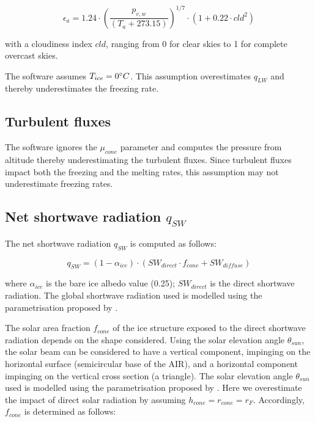 \documentclass[tc, manuscript]{copernicus}
\begin{document}
\begin{equation}
	\epsilon_a=1.24 \cdot (\frac{p_{v,w}}{(T_a+273.15)})^{1/7}\cdot(1+0.22\cdot{cld}^2) \label{eqn:atm_e}
\end{equation}

with a cloudiness index $cld$, ranging from 0 for clear skies to 1 for complete overcast skies. 

The software assumes $T_{ice} = 0 ^{\circ} C$. This assumption overestimates $q_{LW}$ and thereby underestimates
the freezing rate.

\subsection{Turbulent fluxes} \label{sec:Qs}

The software ignores the $\mu_{cone}$ parameter and computes the pressure from altitude thereby underestimating
the turbulent fluxes. Since turbulent fluxes impact both the freezing and the melting rates, this assumption may
not underestimate freezing rates.

\subsection{Net shortwave radiation \texorpdfstring{$q_{SW}$}{Lg}}
\label{sec:SW}

The net shortwave radiation $q_{SW}$ is computed as follows:

\begin{equation} q_{SW} = (1- \alpha_{ice}) \cdot ( SW_{direct} \cdot f_{cone} + SW_{diffuse})
\label{eqn:SW} \end{equation}

where $\alpha_{ice}$ is the bare ice albedo value (0.25); $SW_{direct}$ is the direct shortwave radiation. The
global shortwave radiation used is modelled using the parametrisation proposed by \cite{woolfComputationSolarElevation1968}.

The solar area fraction $f_{cone}$ of the ice structure exposed to the direct shortwave radiation depends on the
shape considered. Using the solar elevation angle $\theta_{sun}$, the solar beam can be considered to have a
vertical component, impinging on the horizontal surface (semicircular base of the AIR), and a horizontal
component impinging on the vertical cross section (a triangle). The solar elevation angle $\theta_{sun}$ used is
modelled using the parametrisation proposed by \cite{woolfComputationSolarElevation1968}. Here we overestimate the impact of direct
solar radiation by assuming $h_{cone} = r_{cone} = r_{F}$. Accordingly, $f_{cone}$ is determined as follows:
\end{document}
